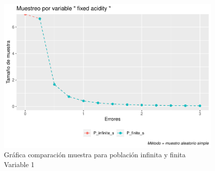 \documentclass[
]{article}
\begin{document}
\begin{figure}
\centering
\includegraphics{1_examen_solucion_files/figure-latex/grafica var1-1.pdf}
\caption{Gráfica comparación muestra para población infinita y finita
Variable 1}
\end{figure}
\end{document}
